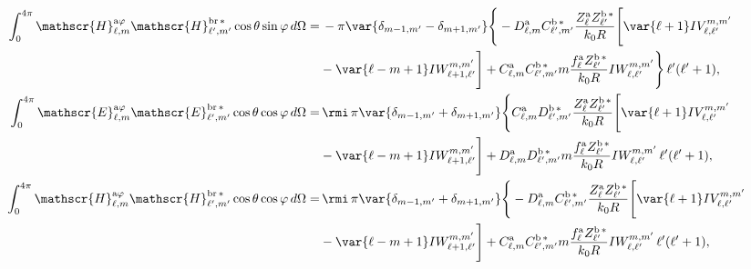 \begin{align} 
\int_0^{4\pi}\mathscr{H}_{\ell, m}^{\text{a}\varphi}\mathscr{H}_{\ell^{\prime}, m^{\prime}}^{\text{br}\,*}\cos\theta\sin\varphi \, d\Omega
%
 =& \, - \pi \var{ \delta_{m-1, m^{\prime}} - \delta_{m+1, m^{\prime}} } \Bigg\{ -D_{\ell, m}^{\rm a} C_{\ell^{\prime}, m^{\prime}}^{\rm b \, *} \frac{Z_{\ell}^{\rm a} Z_{\ell^{\prime}}^{\rm b \, *}}{k_0 R} \Bigg[\var{\ell +1} IV_{\ell, \ell^{\prime}}^{m, m^{\prime}} \nonumber \\ 
% 
&-\var{\ell - m +1} IW_{\ell + 1, \ell^{\prime}}^{m, m^{\prime}} \Bigg]
%
 + C_{\ell, m}^{\rm a} C_{\ell^{\prime}, m^{\prime}}^{\rm b \, *} m \frac{f_{\ell}^{\rm a} Z_{\ell^{\prime}}^{\rm b\, *}}{k_0 R} IW_{\ell, \ell^{\prime}}^{m, m^{\prime}} \Bigg\} \, \ell^{\prime}(\ell^{\prime}+1),  \\
% 
%
%
%
\int_0^{4\pi}\mathscr{E}_{\ell, m}^{\text{a}\varphi}\mathscr{E}_{\ell^{\prime}, m^{\prime}}^{\text{br}\,*}\cos\theta\cos\varphi \, d\Omega
%
 =& \, \rmi \, \pi \var{ \delta_{m-1, m^{\prime}} + \delta_{m+1, m^{\prime}} } \Bigg\{ C_{\ell, m}^{\rm a} D_{\ell^{\prime}, m^{\prime}}^{\rm b \, *} \frac{Z_{\ell}^{\rm a} Z_{\ell^{\prime}}^{\rm b \, *}}{k_0 R} \Bigg[\var{\ell +1} IV_{\ell, \ell^{\prime}}^{m, m^{\prime}} \nonumber \\ 
% 
&-\var{\ell - m +1} IW_{\ell + 1, \ell^{\prime}}^{m, m^{\prime}} \Bigg]
%
 + D_{\ell, m}^{\rm a} D_{\ell^{\prime}, m^{\prime}}^{\rm b \, *} m \frac{f_{\ell}^{\rm a} Z_{\ell^{\prime}}^{\rm b\, *}}{k_0 R} IW_{\ell, \ell^{\prime}}^{m, m^{\prime}} \, \ell^{\prime}(\ell^{\prime}+1),\\
%
%
\int_0^{4\pi}\mathscr{H}_{\ell, m}^{\text{a}\varphi}\mathscr{H}_{\ell^{\prime}, m^{\prime}}^{\text{br}\,*}\cos\theta\cos\varphi \, d\Omega
%
 =& \, \rmi \, \pi \var{ \delta_{m-1, m^{\prime}} + \delta_{m+1, m^{\prime}} } \Bigg\{ -D_{\ell, m}^{\rm a} C_{\ell^{\prime}, m^{\prime}}^{\rm b \, *} \frac{Z_{\ell}^{\rm a} Z_{\ell^{\prime}}^{\rm b \, *}}{k_0 R} \Bigg[\var{\ell +1} IV_{\ell, \ell^{\prime}}^{m, m^{\prime}} \nonumber \\ 
% 
&-\var{\ell - m +1} IW_{\ell + 1, \ell^{\prime}}^{m, m^{\prime}} \Bigg]
%
 + C_{\ell, m}^{\rm a} C_{\ell^{\prime}, m^{\prime}}^{\rm b \, *} m \frac{f_{\ell}^{\rm a} Z_{\ell^{\prime}}^{\rm b\, *}}{k_0 R} IW_{\ell, \ell^{\prime}}^{m, m^{\prime}} \, \ell^{\prime}(\ell^{\prime}+1),
% 
%
%
%
\end{align}
